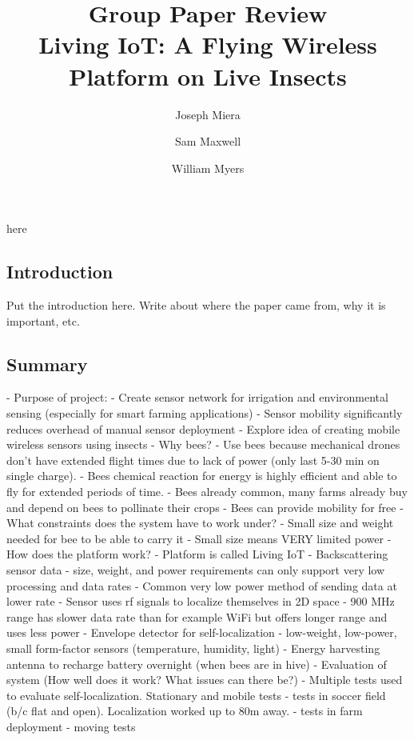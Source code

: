 here\documentclass[letterpaper,twocolumn,10pt]{article}
\title{Group Paper Review\\
Living IoT: A Flying Wireless Platform on Live Insects}
\author{Joseph Miera}
\author{Sam Maxwell}
\author{William Myers}
\affil{Brigham Young University}
\begin{document}
\maketitle

\subsection*{Introduction}

Put the introduction here. Write about where the paper came from, why it is important, etc.

\subsection*{Summary}

- Purpose of project: 
    - Create sensor network for irrigation and environmental sensing (especially for smart farming applications)
    - Sensor mobility significantly reduces overhead of manual sensor deployment
    - Explore idea of creating mobile wireless sensors using insects
- Why bees?
    - Use bees because mechanical drones don't have extended flight times due to lack of power (only last 5-30 min on single charge). 
    - Bees chemical reaction for energy is highly efficient and able to fly for extended periods of time.
    - Bees already common, many farms already buy and depend on bees to pollinate their crops
    - Bees can provide mobility for free
- What constraints does the system have to work under?
    - Small size and weight needed for bee to be able to carry it
    - Small size means VERY limited power
- How does the platform work?
    - Platform is called Living IoT
    - Backscattering sensor data - size, weight, and power requirements can only support very low processing and data rates
        - Common very low power method of sending data at lower rate
    - Sensor uses rf signals to localize themselves in 2D space
    - 900 MHz range has slower data rate than for example WiFi but offers longer range and uses less power
    - Envelope detector for self-localization
    - low-weight, low-power, small form-factor sensors (temperature, humidity, light)
    - Energy harvesting antenna to recharge battery overnight (when bees are in hive)
- Evaluation of system (How well does it work? What issues can there be?)
    - Multiple tests used to evaluate self-localization. Stationary and mobile tests
        - tests in soccer field (b/c flat and open). Localization worked up to 80m away.
        - tests in farm deployment
        - moving tests 
\end{document}
